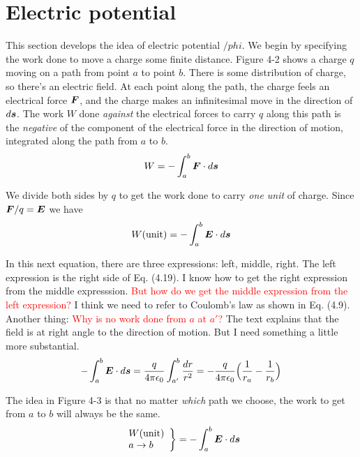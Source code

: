 \section{Electric potential}

This section develops the idea of electric potential $/phi$.
We begin by specifying the work done to move a charge some finite distance.
Figure 4-2 shows a charge $q$ moving on a path from point $a$ to point $b$.
There is some distribution of charge, so there's an electric field.
At each point along the path, the charge feels an electrical force $\boldsymbol{F}$,
and the charge makes an infinitesimal move in the direction of $d\boldsymbol{s}$.
The work $W$ done \emph{against} the electrical forces to carry $q$ along this path
is the \emph{negative} of the component of the electrical force in the 
direction of motion, integrated along the path from $a$ to $b$.
\begin{equation*}
  W = - \int_a^b \boldsymbol{F} \cdot d\boldsymbol{s}
\end{equation*}

We divide both sides by $q$ to get the work done to carry \emph{one unit} of charge.
Since $\boldsymbol{F} /q = \boldsymbol{E}$ we have
\begin{equation}
  W \mathrm{(unit)} = - \int_a^b \boldsymbol{E} \cdot d\boldsymbol{s}
\end{equation}

In this next equation, there are three expressions: left, middle, right.
The left expression is the right side of Eq. (4.19).
I know how to get the right expression from the middle expresssion.
\textcolor{red}{But how do we get the middle expression from the left expression?}
I think we need to refer to Coulomb's law as shown in Eq. (4.9).
Another thing: \textcolor{red}{Why is no work done from $a$ at $a'$?}
The text explains that the field is at right angle to the direction of motion.
But I need something a little more substantial.
\begin{equation}
  - \int_a^b \boldsymbol{E} \cdot d\boldsymbol{s}
  = \frac{q}{4\pi\epsilon_0} \int_{a'}^b \frac{dr}{r^2}
  = - \frac{q}{4\pi\epsilon_0} \Big(\frac{1}{r_a} - \frac{1}{r_b}\Big)
\end{equation}

The idea in Figure 4-3 is that no matter \emph{which} path we choose,
the work to get from $a$ to $b$ will always be the same.
\begin{equation*}
  \left. \begin{array}{l}
    W \mathrm{(unit)} \\
    a \to b
  \end{array} \right\}
  = - \int_a^b \boldsymbol{E} \cdot d\boldsymbol{s}
\end{equation*}

